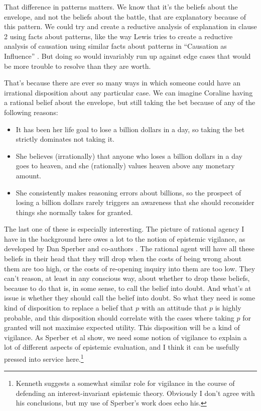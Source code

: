 \documentclass[11pt,]{book}
\providecommand{\tightlist}{%
  \setlength{\itemsep}{0pt}\setlength{\parskip}{0pt}}
\let\rmarkdownfootnote\footnote%
\def\footnote{\protect\rmarkdownfootnote}
\begin{document}
That difference in patterns matters. We know that it's the beliefs about the envelope, and not the beliefs about the battle, that are explanatory because of this pattern. We could try and create a reductive analysis of explanation in clause 2 using facts about patterns, like the way Lewis tries to create a reductive analysis of causation using similar facts about patterns in ``Causation as Influence'' \citep{Lewis2004a}. But doing so would invariably run up against edge cases that would be more trouble to resolve than they are worth.

That's because there are ever so many ways in which someone could have an irrational disposition about any particular case. We can imagine Coraline having a rational belief about the envelope, but still taking the bet because of any of the following reasons:

\begin{itemize}
\tightlist
\item
  It has been her life goal to lose a billion dollars in a day, so taking the bet strictly dominates not taking it.
\item
  She believes (irrationally) that anyone who loses a billion dollars in a day goes to heaven, and she (rationally) values heaven above any monetary amount.
\item
  She consistently makes reasoning errors about billions, so the prospect of losing a billion dollars rarely triggers an awareness that she should reconsider things she normally takes for granted.
\end{itemize}

The last one of these is especially interesting. The picture of rational agency I have in the background here owes a lot to the notion of epistemic vigilance, as developed by Dan Sperber and co-authors \citep{SperberEtAl2010}. The rational agent will have all these beliefs in their head that they will drop when the costs of being wrong about them are too high, or the costs of re-opening inquiry into them are too low. They can't reason, at least in any conscious way, about whether to drop these beliefs, because to do that is, in some sense, to call the belief into doubt. And what's at issue is whether they should call the belief into doubt. So what they need is some kind of disposition to replace a belief that \(p\) with an attitude that \(p\) is highly probable, and this disposition should correlate with the cases where taking \(p\) for granted will not maximise expected utility. This disposition will be a kind of vigilance. As Sperber et al show, we need some notion of vigilance to explain a lot of different aspects of epistemic evaluation, and I think it can be usefully pressed into service here.\footnote{Kenneth \citet{Boyd2015} suggests a somewhat similar role for vigilance in the course of defending an interest-invariant epistemic theory. Obviously I don't agree with his conclusions, but my use of Sperber's work does echo his.}
\end{document}
